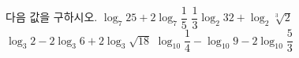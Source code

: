 다음 값을 구하시오.
 $\log_7 25+2\log_7 \dfrac{1}{5}$
 $\dfrac{1}{3}\log_2 32+\log_2 \sqrt[3]{2}$
 $\log_3 2-2\log_3 6+2\log_3 \sqrt{18}$
 $\log_{10} \dfrac{1}{4}-\log_{10} 9-2\log_{10} \dfrac{5}{3}$
